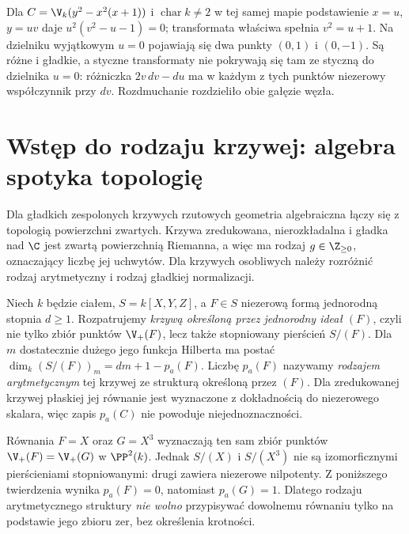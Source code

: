 \begin{przyklad}
Dla $C=\V_k(y^2-x^2(x+1))$ i $\operatorname{char}k\ne2$
w tej samej mapie podstawienie $x=u$, $y=uv$ daje
$u^2(v^2-u-1)=0$; transformata właściwa spełnia
$v^2=u+1$. Na dzielniku wyjątkowym $u=0$ pojawiają się
dwa punkty $(0,1)$ i $(0,-1)$. Są różne i gładkie,
a styczne transformaty nie pokrywają się tam ze styczną
do dzielnika $u=0$: różniczka
$2v\,dv-du$ ma w każdym z tych punktów niezerowy
współczynnik przy $dv$. Rozdmuchanie rozdzieliło
obie gałęzie węzła.
\end{przyklad}

\section{Wstęp do rodzaju krzywej: algebra spotyka topologię}

Dla gładkich zespolonych krzywych rzutowych geometria
algebraiczna łączy się z topologią powierzchni zwartych.
Krzywa zredukowana, nierozkładalna i gładka nad $\C$
jest zwartą powierzchnią Riemanna, a więc ma rodzaj
$g\in\Z_{\ge0}$, oznaczający liczbę jej uchwytów.
Dla krzywych osobliwych należy rozróżnić rodzaj
arytmetyczny i rodzaj gładkiej normalizacji.

\begin{definicja}
Niech $k$ będzie ciałem, $S=k[X,Y,Z]$, a $F\in S$
niezerową formą jednorodną stopnia $d\ge1$.
Rozpatrujemy \emph{krzywą określoną przez jednorodny
ideał $(F)$}, czyli nie tylko zbiór punktów
$\V_+(F)$, lecz także stopniowany pierścień $S/(F)$.
Dla $m$ dostatecznie dużego jego funkcja Hilberta ma
postać $\dim_k(S/(F))_m=dm+1-p_a(F)$.
Liczbę $p_a(F)$ nazywamy \emph{rodzajem arytmetycznym}
tej krzywej ze strukturą określoną przez $(F)$.
Dla zredukowanej krzywej płaskiej jej równanie jest
wyznaczone z dokładnością do niezerowego skalara,
więc zapis $p_a(C)$ nie powoduje niejednoznaczności.
\end{definicja}

\begin{przyklad}
Równania $F=X$ oraz $G=X^3$ wyznaczają ten sam
zbiór punktów $\V_+(F)=\V_+(G)$ w $\PP^2(k)$.
Jednak $S/(X)$ i $S/(X^3)$ nie są izomorficznymi
pierścieniami stopniowanymi: drugi zawiera niezerowe
nilpotenty. Z poniższego twierdzenia wynika
$p_a(F)=0$, natomiast $p_a(G)=1$.
Dlatego rodzaju arytmetycznego struktury \emph{nie wolno}
przypisywać dowolnemu równaniu tylko na podstawie
jego zbioru zer, bez określenia krotności.
\end{przyklad}

